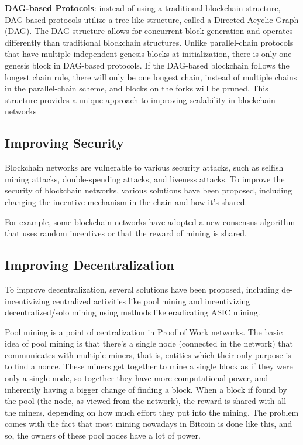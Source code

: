 \textbf{DAG-based Protocols}: instead of using a traditional blockchain structure, DAG-based protocols utilize a tree-like structure, called a Directed Acyclic Graph (DAG). The DAG structure allows for concurrent block generation and operates differently than traditional blockchain structures. Unlike parallel-chain protocols that have multiple independent genesis blocks at initialization, there is only one genesis block in DAG-based protocols. If the DAG-based blockchain follows the longest chain rule, there will only be one longest chain, instead of multiple chains in the parallel-chain scheme, and blocks on the forks will be pruned. This structure provides a unique approach to improving scalability in blockchain networks 

\subsection*{Improving Security}
Blockchain networks are vulnerable to various security attacks, such as selfish mining attacks, double-spending attacks, and liveness attacks. To improve the security of blockchain networks, various solutions have been proposed, including changing the incentive mechanism in the chain and how it's shared.

For example, some blockchain networks have adopted a new consensus algorithm that uses random incentives or that the reward of mining is shared.

\subsection*{Improving Decentralization}
To improve decentralization, several solutions have been proposed, including de-incentivizing centralized activities like pool mining and incentivizing decentralized/solo mining using methods like eradicating ASIC mining.

Pool mining is a point of centralization in Proof of Work networks. The basic idea of pool mining is that there's a single node (connected in the network) that communicates with multiple miners, that is, entities which their only purpose is to find a nonce.
These miners get together to mine a single block as if they were only a single node, so together they have more computational power, and inherently having a bigger change of finding a block. When a block if found by the pool (the node, as viewed from the network), the reward is shared with all the miners, depending on how much effort they put into the mining.
The problem comes with the fact that most mining nowadays in Bitcoin is done like this, and so, the owners of these pool nodes have a lot of power.


